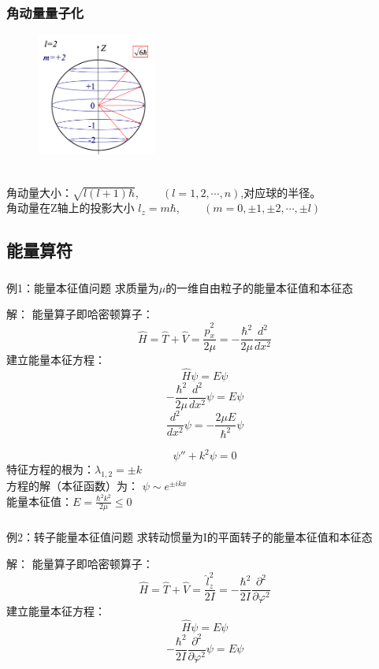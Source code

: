 \begin{frame} 
    \frametitle{角动量量子化}
    \begin{figure} %
        \includegraphics[width=0.35\textwidth]{figs/LandL2.png}   
    \end{figure}
    ~\\
    角动量大小：$\sqrt{l(l+1)\hbar}, \qquad (l=1,2,\cdots, n)$,对应球的半径。\\
    角动量在Z轴上的投影大小 $l_z=m\hbar, \qquad (m=0,\pm 1,\pm 2, \cdots, \pm l)$
\end{frame} 

\subsection{能量算符}

\begin{frame} 
    \frametitle{}  
    \begin{tcolorbox2}{例1：能量本征值问题}
    求质量为$\mu$的一维自由粒子的能量本征值和本征态  
    \end{tcolorbox2}
    \alert{解：} 能量算子即哈密顿算子：
    $$ \hat{H}=\hat{T}+\hat{V}=\frac{\hat{p}_x ^2 }{2\mu} = -\frac{\hbar^2}{2\mu}\frac{d^2}{dx^2} $$
    建立能量本征方程：
    $$ \hat{H} \psi =E \psi $$
    $$ -\frac{\hbar^2}{2\mu}\frac{d^2}{dx^2} \psi =E \psi $$
    $$ \frac{d^2}{dx^2} \psi = -\frac{2\mu E}{\hbar^2} \psi $$
\end{frame}

\begin{frame} 
    $$  \psi'' + k^2 \psi =0 $$
    特征方程的根为：$\lambda_{1,2}=\pm k$ \\
    方程的解（本征函数）为： $\psi \sim e^{\pm ikx}$  \\
    能量本征值：$ E= \frac{\hbar^2 k^2 }{2\mu} \le 0 $
\end{frame}


\begin{frame} 
    \frametitle{ }
    \begin{tcolorbox2}{例2：转子能量本征值问题}
    求转动惯量为I的平面转子的能量本征值和本征态 
    \end{tcolorbox2}
    \alert{解：} 能量算子即哈密顿算子：
    $$ \hat{H}=\hat{T}+\hat{V}=\frac{\hat{l}_z ^2 }{2I} = -\frac{\hbar^2}{2I}\frac{\partial^2}{\partial\varphi^2} $$
    建立能量本征方程：
    $$ \hat{H} \psi =E \psi $$
    $$ -\frac{\hbar^2}{2I}\frac{\partial^2}{\partial\varphi^2} \psi =E \psi $$
\end{frame}

